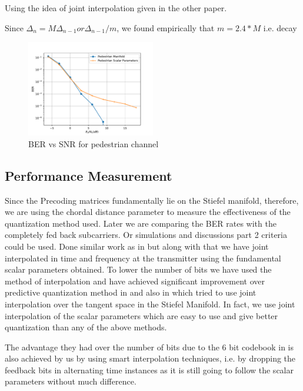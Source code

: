 \documentclass[conference]{IEEEtran}
\begin{document}
Using the idea of joint interpolation given in the other paper.

Since $\Delta_{n} = M\Delta_{n-1} or \Delta_{n-1}/m $, we found empirically that $m=2.4*M$ i.e. decay

\begin{figure}
\includegraphics[width=0.5\textwidth]{images/pedestrian.pdf}
\caption{BER vs SNR for pedestrian channel}
\label{ber_overview}
\vspace{-5pt}
\end{figure}

\subsection{Performance Measurement}

\label{setting}



\noindent Since the Precoding matrices fundamentally lie on the Stiefel manifold, therefore, we are using the chordal distance parameter to measure the effectiveness of the quantization method used. Later we are comparing the BER rates with the completely fed back subcarriers. Or simulations and discussions part 2 criteria could be used. Done similar work as in \cite{4114278} but along with that we have joint interpolated in time and frequency at the transmitter using the fundamental scalar parameters obtained. To lower the number of bits we have used the method of interpolation and have achieved significant improvement over predictive quantization method in \cite{6891198} and also in \cite{Gupt1905:Predictive} which tried to use joint interpolation over the tangent space in the Stiefel Manifold. In fact, we use joint interpolation of the scalar parameters which are easy to use and give better quantization than any of the above methods.

The advantage they had over the number of bits due to the 6 bit codebook in \cite{6891198,Gupt1905:Predictive} is also achieved by us by using smart interpolation techniques, i.e. by dropping the feedback bits in alternating time instances as it is still going to follow the scalar parameters without much difference.
\end{document}
